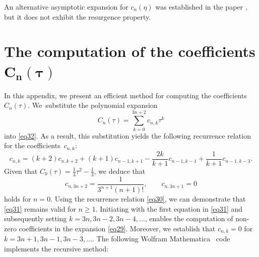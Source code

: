 An alternative asymptotic expansion for $c_n (\eta)$ was established in the paper \cite{Dunster1998}, but it does not exhibit the resurgence property.

\section[The computation of the coefficients C\_n(tau)]{The computation of the coefficients $\boldsymbol{C_n(\tau)}$}\label{appendixb}

In this appendix, we present an efficient method for computing the coefficients $C_n(\tau)$. We~substitute the polynomial expansion
\begin{equation}\label{eq29}
C_n(\tau) = \sum_{k=0}^{3n+2} c_{n,k}\tau^k
\end{equation}
into \eqref{eq32}. As a result, this substitution yields the following recurrence relation for the coefficients~$c_{n,k}$:
\begin{equation}\label{eq30}
c_{n,k}=(k+2)c_{n,k+2}+(k+1) c_{n-1,k+1}-\frac{2k}{k+1}c_{n-1,k-1}+\frac{1}{k+1}c_{n-1,k-3}.
\end{equation}
Given that $C_0 (\tau ) = \frac{1}{3}\tau^2 -\frac{1}{3}$, we deduce that
\begin{equation}\label{eq31}
c_{n,3n+2}=\frac{1}{3^{n+1}(n+1)!},\qquad c_{n,3n+1}=0
\end{equation}
holds for $n=0$. Using the recurrence relation \eqref{eq30}, we can demonstrate that \eqref{eq31} remains valid for $n\geq1$. Initiating with the first equation in \eqref{eq31} and subsequently setting $k=3n, 3n-2, \allowbreak 3n-4, \dots$, enables the computation of non-zero coefficients in the expansion \eqref{eq29}. Moreover, we establish that $c_{n,k}=0$ for $k=3n+1, 3n-1, 3n-3, \dots$. The following Wolfram Mathematica~\cite{Mathematica} code implements the recursive method:
